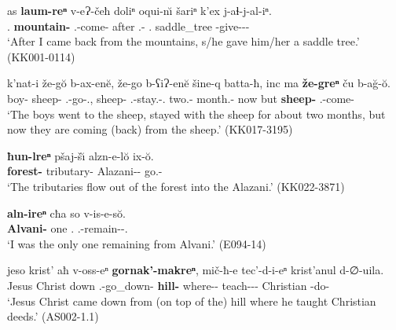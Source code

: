\begin{exe}
	\ex\label{simplenp-ex35}
	\begin{xlist}
		
			\ex\label{simplenp-ex35a}
			\gll as	\textbf{laum-reⁿ}	v-eɁ-čeħ doliⁿ oqui-n\u{\i}	šariⁿ	k'ex	j-aɬ-j-al-iⁿ.    \\
			{\Fsg}.{\Erg}	\textbf{mountain-{\Abl}}	{\M}.{\Sg}-come-{\Ante}	after	{\Dist}.{\Obl}-{\Dat}	{\Poss}.{\Refl}	saddle\_tree	{\J}-give-{\J}-{\Intr}-{\Aor}   \\
			\trans `After I came back from the mountains, s/he gave him/her a saddle tree.’
			\hfill (KK001-0114)
		
		
		
			\ex\label{simplenp-ex35b}
			\gll k'nat-i že-g\u{o} b-ax-en\u{e}, že-go b-ʕiɁ-en\u{e} šine-q batta-ħ, inc ma \textbf{že-greⁿ} ču b-a\u{g}-\u{o}. \\
			boy-{\Pl} sheep-{\All} {\M}.{\Pl}-go-{\Aor}.{\Seq}, sheep-{\Adess} {\M}.{\Pl}-stay.{\Pfv}-{\Aor}.{\Seq} two.{\Obl}-{\Approx} month.{\Obl}-{\Ess} now but \textbf{sheep-{\Adabl}} {\Pv} {\M}.{\Pl}-come-{\Npst}      \\
			\trans `The boys went to the sheep, stayed with the sheep for about two months, but now they are coming (back) from the sheep.'
			\hfill (KK017-3195)
		
		
		   
			\ex\label{simplenp-ex35c}
			\gll \textbf{ħun-lreⁿ} pšaj-š\u{\i} alzn-e-l\u{o} ix-\u{o}. \\
			\textbf{forest-{\Interabl}} tributary-{\Pl} Alazani-{\Obl}-{\Interlat} go.{\Ipfv}-{\Npst}    \\
			\trans `The tributaries flow out of the forest into the Alazani.'
			\hfill (KK022-3871)
		
		
		
			\ex\label{simplenp-ex35d}
			\gll \textbf{aln-ireⁿ} cħa so v-is-e-s\u{o}. \\
			\textbf{Alvani-{\Elat}} one {\Fsg}.{\Nom} {\M}.{\Sg}-remain-{\Aor}-{\Fsg}.{\Nom} \\
			\trans `I was the only one remaining from Alvani.'
			\hfill (E094-14) \\
		
		
		
			\ex\label{simplenp-ex35e}
			
			\gll jeso krist' aħ v-oss-eⁿ \textbf{gornak'-makreⁿ}, mič-ħ-e tec'-d-i-eⁿ krist'anul d-∅-uila. \\
			Jesus Christ down {\M}.{\Sg}-go\_down-{\Aor} \textbf{hill-{\Superabl}} where-{\Ess}-{\Rel} teach-{\D}-{\Tr}-{\Aor} Christian {\D}-do-{\Nmlz} \\
			\trans `Jesus Christ came down from (on top of the) hill where he taught Christian deeds.'
			\hfill (AS002-1.1)
		
		
	\end{xlist}
\end{exe}

